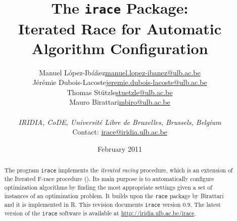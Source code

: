 \documentclass[a4paper]{article}
\makeatletter
\newcommand{\irace}{\texttt{irace}\xspace}
\newcommand{\iraceversion}{0.9\xspace}
\newcommand{\techrep}{2011-004}
\newcommand{\techdate}{February 2011}
\newcommand{\revdate}{February 2011}
\providecommand{\email}[2]{\normalsize\href{mailto:#1@#2}{\textsf{#1}\textrm{@}\textsf{#2}}}
\newcommand{\aR}{\textsf{R}\xspace}
\newcommand{\IFRACE}{\text{I/F-Race}\xspace}
\makeatother
\begin{document}
\title{The \irace Package:\\ Iterated Race for Automatic Algorithm Configuration}

\author{
  \begin{minipage}[c]{0.9\linewidth}
    \begin{center}
      \begin{tabular*}{0.7\linewidth}{@{\extracolsep{\fill}}lr}
        Manuel L\'opez-Ib\'a\~nez &\email{manuel.lopez-ibanez}{ulb.ac.be} \\    
        J\'er\'emie Dubois-Lacoste & \email{jeremie.dubois-lacoste}{ulb.ac.be} \\               
        Thomas St\"utzle & \email{stuetzle}{ulb.ac.be} \\              
        Mauro Birattari & \email{mbiro}{ulb.ac.be} \\                 
      \end{tabular*}\\[1.5ex]
      \normalsize\emph{IRIDIA, CoDE, Universit\'e Libre de Bruxelles, Brussels, Belgium}\\
      Contact: \email{irace}{iridia.ulb.ac.be}
    \end{center}
  \end{minipage}}

\date{\revdate}

\IridiaTrCover[%
  author={%
Manuel \textsc{L\'opez-Ib\'a\~nez} \and J\'er\'emie \textsc{Dubois-Lacoste}%
\and Thomas \textsc{St\"utzle} \and Mauro \textsc{Birattari}
},
  date=\techdate,
  number=\techrep]%

\maketitle

\begin{abstract}
  The program \irace implements the \emph{iterated racing} procedure,
  which is an extension of the Iterated F-race procedure (\IFRACE).
  Its main purpose is to automatically configure optimization
  algorithms by finding the most appropriate settings given a set of
  instances of an optimization problem. It builds upon the
  \texttt{race} package by Birattari and it is implemented in
  \aR. This revision documents \irace version \iraceversion. The
  latest version of the \irace software is available at \url{http://iridia.ulb.ac.be/irace}.
\end{abstract}
\end{document}
